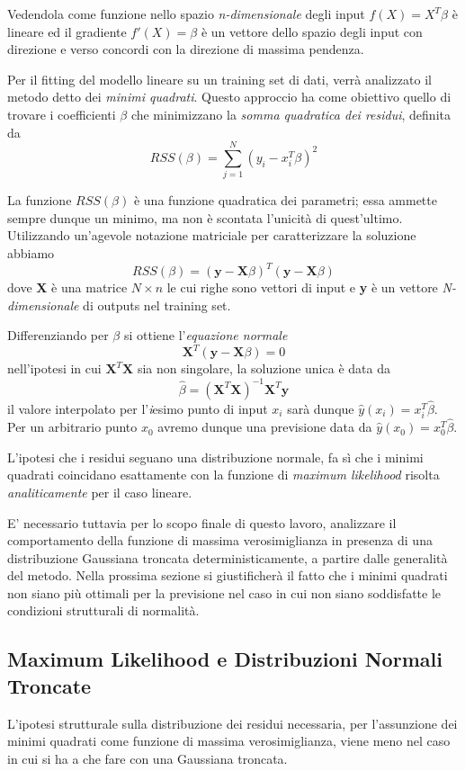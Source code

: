 \documentclass[a4paper]{report}
\begin{document}
Vedendola come funzione nello spazio \textit{n-dimensionale} degli input $f(X)=X^T\beta$ è lineare ed il gradiente $f'(X)=\beta$ è un vettore dello spazio degli input con direzione e verso concordi con la direzione di massima pendenza.

Per il fitting del modello lineare su un training set di dati, verrà analizzato il metodo detto dei \textit{minimi quadrati}.
Questo approccio ha come obiettivo quello di trovare i coefficienti $\beta$ che minimizzano la \textit{somma quadratica dei residui}, definita da \[RSS(\beta)=\sum_{j=1}^{N}(y_i-x_i^T\beta)^2\]

La funzione $RSS(\beta)$ è una funzione quadratica dei parametri; essa ammette sempre dunque un minimo, ma non è scontata l'unicità di quest'ultimo.
Utilizzando un'agevole notazione matriciale per caratterizzare la soluzione abbiamo
\[RSS(\beta)=(\textbf{y}-\textbf{X}\beta)^T(\textbf{y}-\textbf{X}\beta)\]
dove \textbf{X} è una matrice $N \times n$ le cui righe sono vettori di input e \textbf{y} è un vettore \textit{N-dimensionale} di outputs nel training set.

Differenziando per $\beta$ si ottiene l'\textit{equazione normale}
\[\textbf{X}^T(\textbf{y}-\textbf{X}\beta)=0\]
nell'ipotesi in cui $\textbf{X}^T\textbf{X}$ sia non singolare, la soluzione unica è data da
\[\hat{\beta}=(\textbf{X}^T\textbf{X})^{-1}\textbf{X}^T\textbf{y}\]
il valore interpolato per l'\textit{i}esimo punto di input $x_i$ sarà dunque $\hat{y}(x_i)=x_i^T\hat{\beta}$. Per un arbitrario punto $x_0$ avremo dunque una previsione data da $\hat{y}(x_0)=x_0^T\hat{\beta}$.

L'ipotesi che i residui seguano una distribuzione normale, fa sì che i minimi quadrati coincidano esattamente con la funzione di \textit{maximum likelihood} risolta \textit{analiticamente} per il caso lineare.

E' necessario tuttavia per lo scopo finale di questo lavoro, analizzare il comportamento della funzione di massima verosimiglianza in presenza di una distribuzione Gaussiana troncata deterministicamente, a partire dalle generalità del metodo. 
Nella prossima sezione si giustificherà il fatto che i minimi quadrati non siano più ottimali per la previsione nel caso in cui non siano soddisfatte le condizioni strutturali di normalità.

\subsection{Maximum Likelihood e Distribuzioni Normali Troncate}
L'ipotesi strutturale sulla distribuzione dei residui necessaria, per l'assunzione dei minimi quadrati come funzione di massima verosimiglianza, viene meno nel caso in cui si ha a che fare con una Gaussiana troncata.
\end{document}
